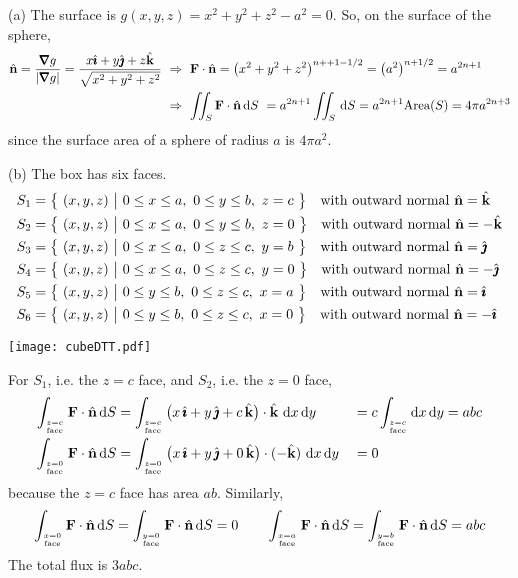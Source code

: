 \begin{solution} 
(a) The surface is $g(x,y,z)=x^2+y^2+z^2-a^2=0$. So,
on the surface of the sphere,
\begin{align*}
\hn =\frac{\vnabla g}{|\vnabla g|}=\frac{x\hi+y\hj+z\hk}{\sqrt{x^2+y^2+z^2}}
&\ \Rightarrow\   \vF\cdot\hn = \big(x^2+y^2+z^2\big)^{n++1-1/2}
={\big(a^2\big)}^{n+1/2}=a^{2n+1}\\
&\ \Rightarrow\  \dblInt_S\vF\cdot\hn \,\dee{S}\ =a^{2n+1}\dblInt_S\,\dee{S}
=a^{2n+1}\text{Area}(S)
=4\pi a^{2n+3}
\end{align*}
since the surface area of a sphere of radius $a$ is $4\pi a^2$.

(b) The box has six faces.
\begin{align*}
S_1&=\big\{ \ (x,y,z)\ \big|\ 0\le x\le a,\ 0\le y\le b,\ z=c\ \big\}\quad
   \text{with outward normal $\hat{\mathbf{n}}=\hat{\mathbf{k}}$} \\
S_2&=\big\{ \ (x,y,z)\ \big|\ 0\le x\le a,\ 0\le y\le b,\ z=0\ \big\}\quad
   \text{with outward normal $\hat{\mathbf{n}}=-\hat{\mathbf{k}}$} \\
S_3&=\big\{ \ (x,y,z)\ \big|\ 0\le x\le a,\ 0\le z\le c,\ y=b\ \big\}\quad
   \text{with outward normal $\hat{\mathbf{n}}=\hat{\pmb{\jmath}}$} \\
S_4&=\big\{ \ (x,y,z)\ \big|\ 0\le x\le a,\ 0\le z\le c,\ y=0\ \big\}\quad
   \text{with outward normal $\hat{\mathbf{n}}=-\hat{\pmb{\jmath}}$} \\
S_5&=\big\{ \ (x,y,z)\ \big|\ 0\le y\le b,\ 0\le z\le c,\ x=a\ \big\}\quad
   \text{with outward normal $\hat{\mathbf{n}}=\hat{\pmb{\imath}}$} \\
S_6&=\big\{ \ (x,y,z)\ \big|\ 0\le y\le b,\ 0\le z\le c,\ x=0\ \big\}\quad
   \text{with outward normal $\hat{\mathbf{n}}=-\hat{\pmb{\imath}}$} 
\end{align*}
\begin{center}
       \texttt{[image: cubeDTT.pdf]}
\end{center}
For $S_1$, i.e. the $z=c$ face, and $S_2$, i.e. the $z=0$ face,
\begin{alignat*}{3}
\int_{\Atop{z=c}{\rm face}}\vF\cdot\hn\, \dee{S}
&=\int_{\Atop{z=c}{\rm face}}\big(x\,\hi+y\,\hj+c\,\hk\big)\cdot \hk \  \dee{x}\,\dee{y}
&&=c\int_{\Atop{z=c}{\rm face}}\dee{x}\,\dee{y}
=abc
\\
\int_{\Atop{z=0}{\rm face}}\vF\cdot\hn\, \dee{S}
&=\int_{\Atop{z=0}{\rm face}}\big(x\,\hi+y\,\hj+0\,\hk\big)\cdot(-\hk)\  \dee{x}\,\dee{y}
&&=0
\end{alignat*}
because the $z=c$ face has area $ab$.
Similarly,
$$
\int_{\Atop{x=0}{\rm face}}\vF\cdot\hn\, \dee{S}
=\int_{\Atop{y=0}{\rm face}}\vF\cdot\hn\, \dee{S}
=0\qquad
\int_{\Atop{x=a}{\rm face}}\vF\cdot\hn\, \dee{S}
=\int_{\Atop{y=b}{\rm face}}\vF\cdot\hn\, \dee{S}
=abc
$$
The total flux is $3abc$.


\end{solution}

